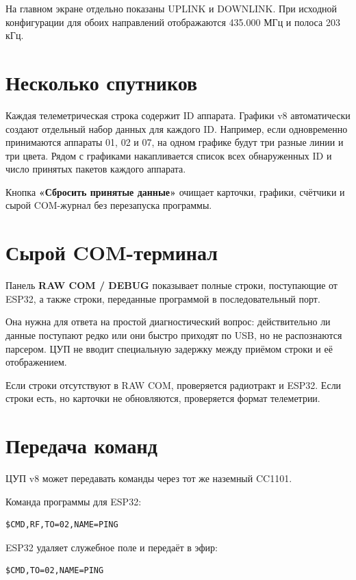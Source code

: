 \documentclass[11pt,a4paper]{article}
\newcommand{\code}[1]{\texttt{\detokenize{#1}}}
\begin{document}
На главном экране отдельно показаны UPLINK и DOWNLINK. При исходной конфигурации для обоих направлений отображаются 435.000 МГц и полоса 203 кГц.

\section{Несколько спутников}

Каждая телеметрическая строка содержит ID аппарата. Графики v8 автоматически создают отдельный набор данных для каждого ID. Например, если одновременно принимаются аппараты 01, 02 и 07, на одном графике будут три разные линии и три цвета. Рядом с графиками накапливается список всех обнаруженных ID и число принятых пакетов каждого аппарата.

Кнопка \textbf{«Сбросить принятые данные»} очищает карточки, графики, счётчики и сырой COM-журнал без перезапуска программы.

\section{Сырой COM-терминал}

Панель \textbf{RAW COM / DEBUG} показывает полные строки, поступающие от ESP32, а также строки, переданные программой в последовательный порт.

Она нужна для ответа на простой диагностический вопрос: действительно ли данные поступают редко или они быстро приходят по USB, но не распознаются парсером. ЦУП не вводит специальную задержку между приёмом строки и её отображением.

Если строки отсутствуют в RAW COM, проверяется радиотракт и ESP32. Если строки есть, но карточки не обновляются, проверяется формат телеметрии.

\section{Передача команд}

ЦУП v8 может передавать команды через тот же наземный CC1101.

Команда программы для ESP32:
\begin{lstlisting}
$CMD,RF,TO=02,NAME=PING
\end{lstlisting}

ESP32 удаляет служебное поле \code{RF} и передаёт в эфир:
\begin{lstlisting}
$CMD,TO=02,NAME=PING
\end{lstlisting}
\end{document}
